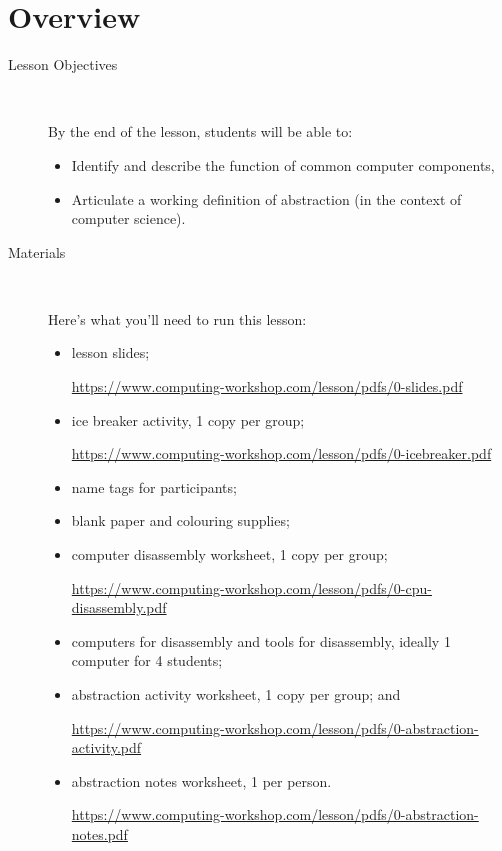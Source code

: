 \documentclass[12pt]{article}
\newcommand{\cwurl}{https://www.computing-workshop.com/lesson/pdfs/}
\begin{document}
\section*{Overview}
\begin{description}
  \item [Lesson Objectives] 
    ~

   By the end of the lesson, students will be able to:
  \begin{itemize}

    \item Identify and describe the function of common computer components,

    \item Articulate a working definition of abstraction (in the context of
      computer science).

  \end{itemize}
  \item [Materials]~

Here's what you'll need to run this lesson:
  \begin{itemize}
    \item
      lesson slides;

      \url{\cwurl 0-slides.pdf}

    \item
      ice breaker activity, 1 copy per group; 

      \url{\cwurl 0-icebreaker.pdf}

    \item
      name tags for participants;

    \item
      blank paper and colouring supplies;

    \item
      computer disassembly worksheet, 1 copy per group;

      \url{\cwurl 0-cpu-disassembly.pdf}

    \item
      computers for disassembly and tools for disassembly, ideally 1
      computer for 4 students;

    \item
      abstraction activity worksheet, 1 copy per group; and

      \url{\cwurl 0-abstraction-activity.pdf}

    \item
      abstraction notes worksheet, 1 per person.

      \url{\cwurl 0-abstraction-notes.pdf}

  \end{itemize}
\end{description}
\end{document}
